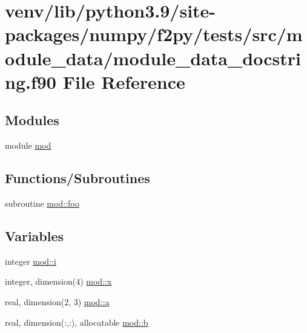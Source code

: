 \hypertarget{module__data__docstring_8f90}{}\section{venv/lib/python3.9/site-\/packages/numpy/f2py/tests/src/module\+\_\+data/module\+\_\+data\+\_\+docstring.f90 File Reference}
\label{module__data__docstring_8f90}
\subsection*{Modules}
\begin{DoxyCompactItemize}
\item 
module \hyperlink{namespacemod}{mod}
\end{DoxyCompactItemize}
\subsection*{Functions/\+Subroutines}
\begin{DoxyCompactItemize}
\item 
subroutine \hyperlink{namespacemod_aecf9fac458f0baf96a355cf347730783}{mod\+::foo}
\end{DoxyCompactItemize}
\subsection*{Variables}
\begin{DoxyCompactItemize}
\item 
integer \hyperlink{namespacemod_a8a14377c000c6d68d147c76d36fbd53d}{mod\+::i}
\item 
integer, dimension(4) \hyperlink{namespacemod_ac711af5fe944dbb95690bef3ed0da8c4}{mod\+::x}
\item 
real, dimension(2, 3) \hyperlink{namespacemod_a3c8f710d4976f60a184c79844967ea3e}{mod\+::a}
\item 
real, dimension(\+:,\+:), allocatable \hyperlink{namespacemod_ae5a0da2d953b0d45daa9398eee04c951}{mod\+::b}
\end{DoxyCompactItemize}
